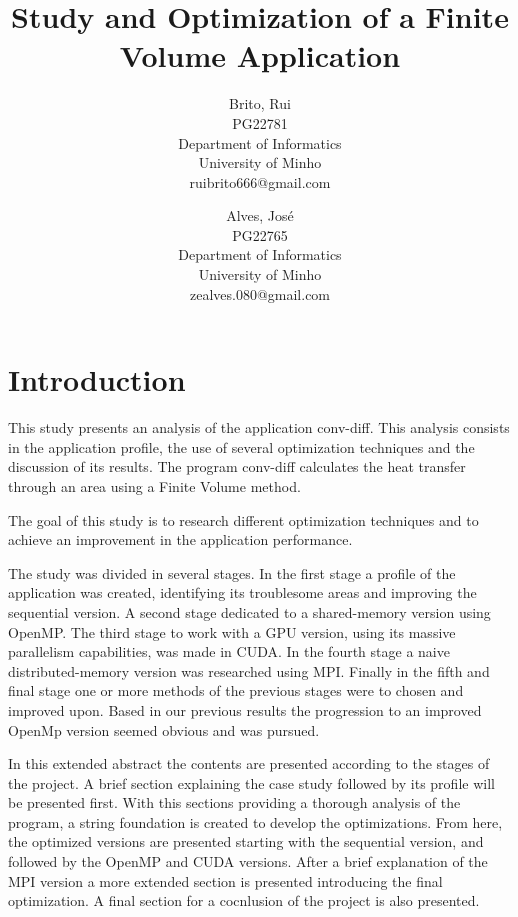 \documentclass[a4paper,10pt,openright,openbib,twocolumn]{article}
\begin{document}
\begin{multicols}{2}
\title{Study and Optimization of a Finite Volume Application}
\author{
    Brito, Rui\\
    PG22781\\
    Department of Informatics\\
    University of Minho\\
    ruibrito666@gmail.com
  \and
    Alves, José\\
    PG22765\\
    Department of Informatics\\
    University of Minho\\
    zealves.080@gmail.com
}
\date{}
\maketitle
\end{multicols}

\section{Introduction}

This study presents an analysis of the application conv-diff. This analysis consists in the application profile, the use of several optimization techniques and the discussion of its results.
The program conv-diff calculates the heat transfer through an area using a Finite Volume method.

The goal of this study is to research different optimization techniques and to achieve an improvement in the application performance.

The study was divided in several stages.
In the first stage a profile of the application was created, identifying its troublesome areas and improving the sequential version.
A second stage dedicated to a shared-memory version using OpenMP.
The third stage to work with a GPU version, using its massive parallelism capabilities, was made in CUDA.
In the fourth stage a naive distributed-memory version was researched using MPI.
Finally in the fifth and final stage one or more methods of the previous stages were to chosen and improved upon. Based in our previous results the progression to an improved OpenMp version seemed obvious and was pursued.

In this extended abstract the contents are presented according to the stages of the project. 
A brief section explaining the case study followed by its profile will be presented first. With this sections providing a thorough analysis of the program, a string foundation is created to develop the optimizations. From here, the optimized versions are presented starting with the sequential version, and followed by the OpenMP and CUDA versions. 
After a brief explanation of the MPI version a more extended section is presented introducing the final optimization. 
A final section for a cocnlusion of the project is also presented.
\end{document}
